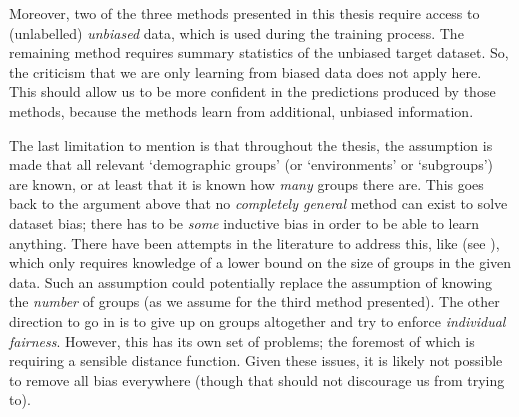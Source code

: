 Moreover, two of the three methods presented in this thesis require access to (unlabelled) \emph{unbiased} data,
which is used during the training process.
The remaining method requires summary statistics of the unbiased target dataset.
So, the criticism that we are only learning from biased data does not apply here.
This should allow us to be more confident in the predictions produced by those methods,
because the methods learn from additional, unbiased information.

The last limitation to mention is that throughout the thesis,
the assumption is made that all relevant `demographic groups' (or `environments' or `subgroups')
are known, or at least that it is known how \emph{many} groups there are.
This goes back to the argument above that no \emph{completely general} method can exist to solve dataset bias;
there has to be \emph{some} inductive bias in order to be able to learn anything.
There have been attempts in the literature to address this,
like \citet{HasSriNamLia18} (see ),
which only requires knowledge of a lower bound on the size of groups in the given data.
Such an assumption could potentially replace the assumption of knowing the \emph{number} of groups
(as we assume for the third method presented).
The other direction to go in is to give up on groups altogether and try to enforce \emph{individual fairness}.
However, this has its own set of problems;
the foremost of which is requiring a sensible distance function.
Given these issues, it is likely not possible to remove all bias everywhere
(though that should not discourage us from trying to).


